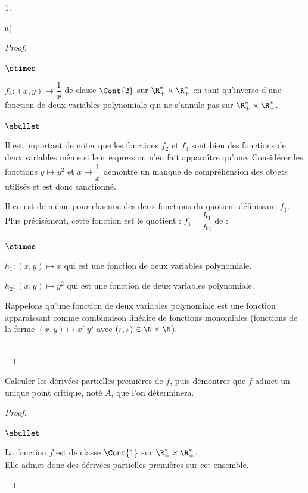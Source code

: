 \documentclass[11pt]{article}%
\begin{document}
\begin{noliste}{1.}
\begin{noliste}{a)}
\begin{proof}
\begin{noliste}{$\stimes$}
      \item $f_3 : (x, y) \mapsto \dfrac{1}{x}$ de classe $\Cont{2}$
        sur $\R_+^{*} \times \R_+^{*}$ en tant qu'inverse d'une
        fonction de deux variables polynomiale qui ne s'annule pas sur
        $\R_+^{*} \times \R_+^{*}$.
      \end{noliste}
      \begin{remarkL}{.98}
        \begin{noliste}{$\sbullet$}
        \item Il est important de noter que les fonctions $f_2$ et
          $f_3$ sont bien des fonctions de deux variables même si leur
          expression n'en fait apparaître qu'une. Considérer les
          fonctions $y \mapsto y^2$ et $x \mapsto \dfrac{1}{x}$
          démontre un manque de compréhension des objets utilisés et
          est donc sanctionné.
        \item Il en est de même pour chacune des deux fonctions du
          quotient définissant $f_1$.\\
          Plus précisément, cette fonction est le quotient : $f_1 =
          \dfrac{h_1}{h_2}$ de :
          \begin{noliste}{$\stimes$}
          \item $h_1 : (x, y) \mapsto x$ qui est une fonction de deux
            variables polynomiale.
          \item $h_2 : (x, y) \mapsto y^2$ qui est une fonction de deux
            variables polynomiale.            
          \end{noliste}
          Rappelons qu'une fonction de deux variables polynomiale est
          une fonction apparaissant comme combinaison linéaire de
          fonctions monomiales (fonctions de la forme $(x, y) \mapsto
          x^r \, y^s$ avec $(r, s) \in \N \times \N$).
        \end{noliste}
      \end{remarkL}~\\[-1.4cm]
    \end{proof}

  \item Calculer les dérivées partielles premières de $f$, puis
    démontrer que $f$ admet un unique point critique, noté $A$, que
    l'on déterminera.

    \begin{proof}~%
      \begin{noliste}{$\sbullet$}
      \item La fonction $f$ est de classe $\Cont{1}$ sur $\R_+^{*}
        \times \R_+^{*}$. \\
        Elle admet donc des dérivées partielles premières sur cet
        ensemble.


\end{noliste}
\end{proof}
\end{noliste}
\end{noliste}
\end{document}
